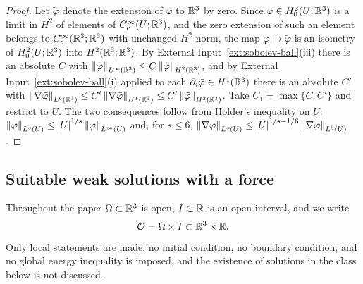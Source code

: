 \documentclass[11pt,reqno]{amsart}
\begin{document}
\begin{proof}
Let $\tilde\varphi$ denote the extension of $\varphi$ to $\mathbb{R}^{3}$ by zero. Since
$\varphi\in H^{2}_{0}(U;\mathbb{R}^{3})$ is a limit in $H^{2}$ of elements of
$C_{c}^{\infty}(U;\mathbb{R}^{3})$, and the zero extension of such an element belongs to
$C_{c}^{\infty}(\mathbb{R}^{3};\mathbb{R}^{3})$ with unchanged $H^{2}$ norm, the map
$\varphi\mapsto\tilde\varphi$ is an isometry of $H^{2}_{0}(U;\mathbb{R}^{3})$ into
$H^{2}(\mathbb{R}^{3};\mathbb{R}^{3})$. By External Input~\ref{ext:sobolev-ball}(iii) there is
an absolute $C$ with
$\left\lVert \tilde\varphi \right\rVert_{L^{\infty}(\mathbb{R}^{3})}\le C\left\lVert \tilde\varphi \right\rVert_{H^{2}(\mathbb{R}^{3})}$,
and by External Input~\ref{ext:sobolev-ball}(i) applied to each
$\partial_{i}\tilde\varphi\in H^{1}(\mathbb{R}^{3})$ there is an absolute $C'$ with
$\left\lVert \nabla\tilde\varphi \right\rVert_{L^{6}(\mathbb{R}^{3})}\le C'\left\lVert \nabla\tilde\varphi \right\rVert_{H^{1}(\mathbb{R}^{3})}
 \le C'\left\lVert \tilde\varphi \right\rVert_{H^{2}(\mathbb{R}^{3})}$. Take $C_{1}=\max\{C,C'\}$ and
restrict to $U$. The two consequences follow from H\"older's inequality on $U$:
$\left\lVert \varphi \right\rVert_{L^{s}(U)}\le\left\lvert U \right\rvert^{1/s}\left\lVert \varphi \right\rVert_{L^{\infty}(U)}$ and,
for $s\le6$,
$\left\lVert \nabla\varphi \right\rVert_{L^{s}(U)}\le\left\lvert U \right\rvert^{1/s-1/6}\left\lVert \nabla\varphi \right\rVert_{L^{6}(U)}$.
\end{proof}

\subsection{Suitable weak solutions with a force}\label{ss:sws}

Throughout the paper $\Omega\subset\mathbb{R}^{3}$ is open, $I\subset\mathbb{R}$ is an open
interval, and we write
\[
  \mathcal{O}=\Omega\times I\subset\mathbb{R}^{3}\times\mathbb{R} .
\]
Only local statements are made: no initial condition, no boundary condition, and
no global energy inequality is imposed, and the existence of solutions in the
class below is not discussed.
\end{document}
